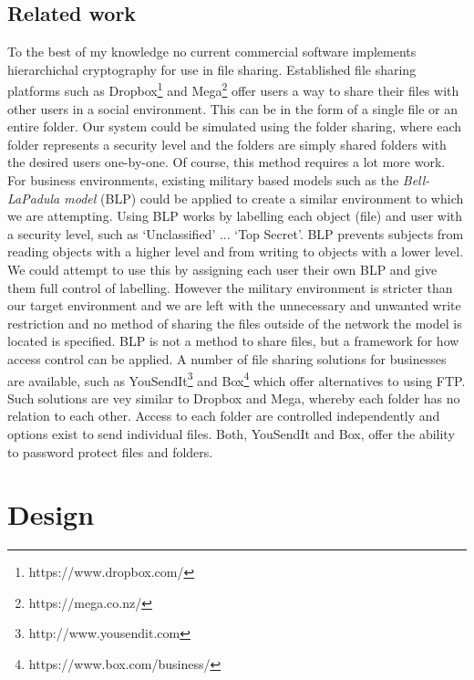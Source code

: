 \documentclass[12pt, titlepage]{article}
\begin{document}
\subsection{Related work}
To the best of my knowledge no current commercial software implements hierarchichal cryptography for use in file sharing.
\newline \indent Established file sharing platforms such as Dropbox\footnote{https://www.dropbox.com/} and Mega\footnote{https://mega.co.nz/} offer users a way to share their files with other users in a social environment. This can be in the form of a single file or an entire folder. Our system could be simulated using the folder sharing, where each folder represents a security level and the folders are simply shared folders with the desired users one-by-one. Of course, this method requires a lot more work.
\newline \indent For business environments, existing military based models such as the \textit{Bell-LaPadula model} (BLP) could be applied to create a similar environment to which we are attempting. Using BLP works by labelling each object (file) and user with a security level, such as `Unclassified' ... `Top Secret'. BLP prevents subjects from reading objects with a higher level and from writing to objects with a lower level. We could attempt to use this by assigning each user their own BLP and give them full control of labelling. However the military environment is stricter than our target environment and we are left with the unnecessary and unwanted write restriction and no method of sharing the files outside of the network the model is located is specified. BLP is not a method to share files, but a framework for how access control can be applied.
\newline \indent A number of file sharing solutions for businesses are available, such as YouSendIt\footnote{http://www.yousendit.com} and Box\footnote{https://www.box.com/business/} which offer alternatives to using FTP. Such solutions are vey similar to Dropbox and Mega, whereby each folder has no relation to each other. Access to each folder are controlled independently and options exist to send individual files. Both, YouSendIt and Box, offer the ability to password protect files and folders.

\newpage
\section{Design}
\end{document}
